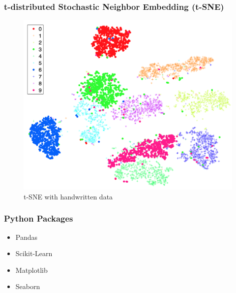 \documentclass{beamer}
\begin{document}
    \begin{frame}
        \frametitle[t-SNE]{t-distributed Stochastic Neighbor Embedding (t-SNE)}

        \begin{figure}[h!]
            \includegraphics[width=0.6 \linewidth]{figures/tsne.png}
            \caption{t-SNE with handwritten data \protect \cite{tsne1}}
        \end{figure}
    \end{frame}

    \begin{frame}
        \frametitle{Python Packages}

        \begin{itemize}
            \item Pandas \cite{pandas1}
            \item Scikit-Learn \cite{sklearn1}
            \item Matplotlib \cite{matplotlib1}
            \item Seaborn \cite{seaborn1}
        \end{itemize}
    \end{frame}
\end{document}
